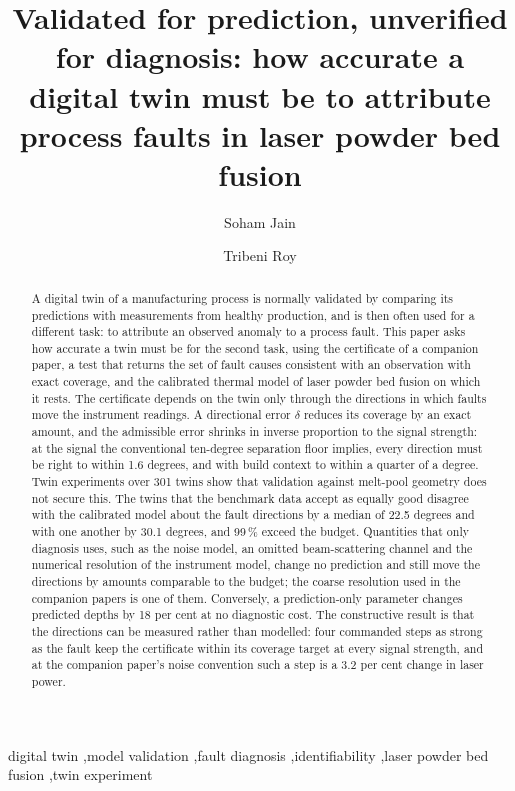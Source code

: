 \documentclass[preprint,12pt]{elsarticle}
\begin{document}
\begin{frontmatter}

\title{Validated for prediction, unverified for diagnosis: how accurate a
digital twin must be to attribute process faults in laser powder bed fusion}

\author[a]{Soham Jain}
\author[a]{Tribeni Roy}

\begin{abstract}
A digital twin of a manufacturing process is normally validated by comparing
its predictions with measurements from healthy production, and is then often
used for a different task: to attribute an observed anomaly to a process fault.
This paper asks how accurate a twin must be for the second task, using the
certificate of a companion paper, a test that returns the set of fault causes
consistent with an observation with exact coverage, and the calibrated thermal
model of laser powder bed fusion on which it rests. The certificate depends on
the twin only through the directions in which faults move the instrument
readings. A directional error $\delta$ reduces its coverage by an exact amount,
and the admissible error shrinks in inverse proportion to the signal strength:
at the signal the conventional ten-degree separation floor implies, every
direction must be right to within 1.6 degrees, and with build context to within
a quarter of a degree. Twin experiments over 301 twins show that validation
against melt-pool geometry does not secure this. The twins that the benchmark
data accept as equally good disagree with the calibrated model about the fault
directions by a median of 22.5 degrees and with one another by 30.1 degrees,
and 99\,\% exceed the budget. Quantities that only diagnosis uses, such as the
noise model, an omitted beam-scattering channel and the numerical resolution of
the instrument model, change no prediction and still move the directions by
amounts comparable to the budget; the coarse resolution used in the companion
papers is one of them. Conversely, a prediction-only parameter changes predicted
depths by 18 per cent at no diagnostic cost. The constructive result is that the
directions can be measured rather than modelled: four commanded steps as strong
as the fault keep the certificate within its coverage target at every signal
strength, and at the companion paper's noise convention such a step is a 3.2 per
cent change in laser power.
\end{abstract}

\begin{keyword}
digital twin \sep model validation \sep fault diagnosis \sep identifiability
\sep laser powder bed fusion \sep twin experiment
\end{keyword}

\end{frontmatter}
\end{document}
